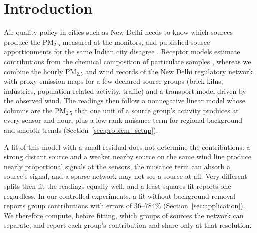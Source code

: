 \section{Introduction}
\label{sec:introduction}

Air-quality policy in cities such as New Delhi needs to know which sources produce the
PM\(_{2.5}\) measured at the monitors, and published source apportionments for the same
Indian city disagree \citep{pant2012critical,karagulian2015contributions}.  Receptor
models estimate contributions from the chemical composition of particulate samples
\citep{watson2002receptor,paatero1994positive}, whereas we combine the hourly
PM\(_{2.5}\) and wind records of the New Delhi regulatory network
\citep{cpcb,cpcb_portal} with proxy emission maps for a few declared source groups
(brick kilns, industries, population-related activity, traffic) and a transport model
driven by the observed wind.  The readings then follow
a nonnegative linear model whose columns are the PM\(_{2.5}\) that one unit of a source
group's activity produces at every sensor and hour, plus a low-rank nuisance term for
regional background and smooth trends (Section~\ref{sec:problem_setup}).

A fit of this model with a small residual does not determine the contributions: a
strong distant source and a weaker nearby source on the same wind line produce nearly
proportional signals at the sensors, the nuisance term can absorb a source's signal,
and a sparse network may not see a source at all.  Very different splits then fit the
readings equally well, and a least-squares fit reports one regardless.  In our
controlled experiments, a fit without background removal reports group contributions
with errors of \(36\)--\(784\%\) (Section~\ref{sec:application}).  We therefore compute, before fitting, which groups of sources the network can
separate, and report each group's contribution and share only at that resolution.

